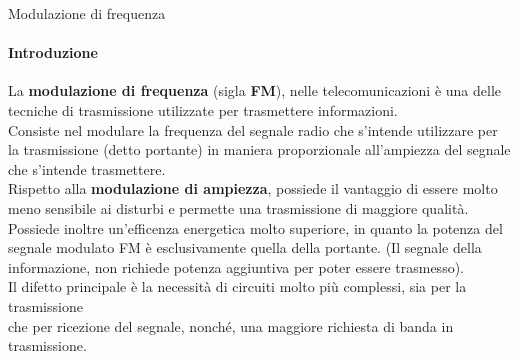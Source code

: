 \documentclass[aspectratio=169]{beamer}
\begin{document}
\begin{frame}{Modulazione di frequenza}
	\framesubtitle{Introduzione}
	La \textbf{modulazione di frequenza} (sigla \textbf{FM}), nelle telecomunicazioni è una delle tecniche di trasmissione utilizzate per trasmettere informazioni.\\
	Consiste nel modulare la frequenza del segnale radio che s'intende utilizzare per la trasmissione (detto portante) in maniera proporzionale all'ampiezza del segnale che s'intende trasmettere.\\
	\medskip
	Rispetto alla \textbf{modulazione di ampiezza}, possiede il vantaggio di essere molto meno sensibile ai disturbi e permette una trasmissione di maggiore qualità. Possiede inoltre un'efficenza energetica molto superiore, in quanto la potenza del segnale modulato FM è esclusivamente quella della portante. (Il segnale della informazione, non richiede potenza aggiuntiva per poter essere trasmesso).\\
	\medskip
	Il difetto principale è la necessità di circuiti molto più complessi, sia per la trasmissione\\ che per ricezione  del segnale, nonché, una maggiore richiesta di banda in trasmissione. \\
	\end{frame}
\end{document}
